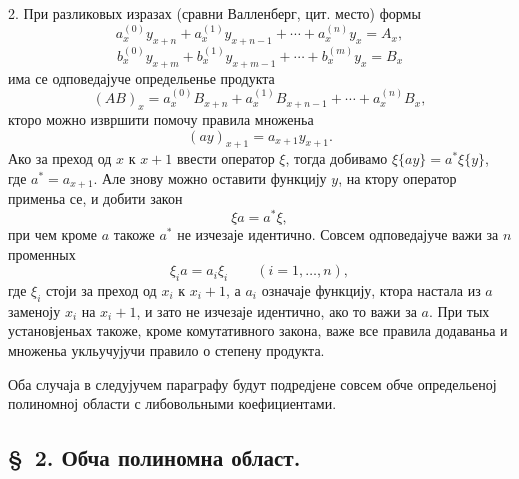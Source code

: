 ﻿\documentclass[11pt]{article}
\begin{document}
2. При разликовых изразах (сравни Валленберг, цит. место) формы
\[
 a_x^{(0)}y_{x+n}+a_x^{(1)}y_{x+n-1}+\cdots+a_x^{(n)}y_x=A_x,
\]
\[
 b_x^{(0)}y_{x+m}+b_x^{(1)}y_{x+m-1}+\cdots+b_x^{(m)}y_x=B_x
\]
има се одповедајуче определьенье продукта
\[
 (AB)_x=a_x^{(0)}B_{x+n}+a_x^{(1)}B_{x+n-1}+\cdots+a_x^{(n)}B_x,
\]
кторо можно извршити помочу правила множеньа
\[
 (ay)_{x+1}=a_{x+1}y_{x+1}.
\]
Ако за преход од \(x\) к \(x+1\) ввести оператор \(\xi\), тогда добивамо \(\xi\{ay\}=a^*\xi\{y\}\), где \(a^*=a_{x+1}\). Але знову можно оставити функцију \(y\), на ктору оператор применьа се, и добити закон
\begin{equation}
 \xi a=a^*\xi,
\tag{3}
\end{equation}
при чем кроме \(a\) такоже \(a^*\) не изчезаје идентично. Совсем одповедајуче важи за \(n\) променных
\begin{equation}
 \xi_i a=a_i\xi_i\qquad (i=1,\ldots,n),
\tag{4}
\end{equation}
где \(\xi_i\) стоји за преход од \(x_i\) к \(x_i+1\), а \(a_i\) означаје функцију, ктора настала из \(a\) заменоју \(x_i\) на \(x_i+1\), и зато не изчезаје идентично, ако то важи за \(a\). При тых установјеньах такоже, кроме комутативного закона, важе все правила додаваньа и множеньа укльучујучи правило о степену продукта.

Оба случаја в следујучем параграфу будут подредјене совсем обче определьеној полиномној области с либовольными коефициентами.

\subsection*{\S~2. Обча полиномна област.}
\end{document}
